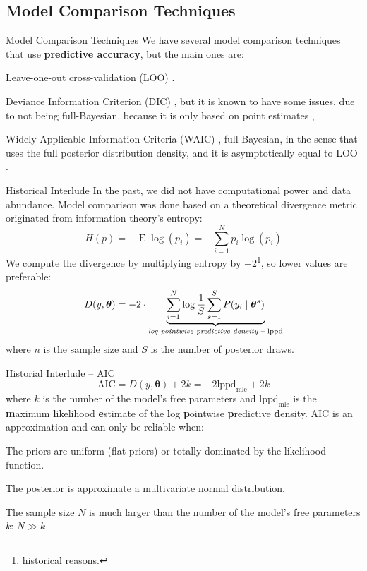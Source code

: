\subsection{Model Comparison Techniques}
\begin{frame}{Model Comparison Techniques}
	We have several model comparison techniques that use \textbf{predictive accuracy},
	but the main ones are:
	\begin{vfilleditems}
		\item Leave-one-out cross-validation (LOO)
		\parencite{vehtariPracticalBayesianModel2015}.
		\item Deviance Information Criterion (DIC)
		\parencite{spiegelhalter2002bayesian},
		but it is known to have some issues,
		due to not being full-Bayesian,
		because it is only based on point estimates \parencite{van2005dic},
		\item Widely Applicable Information Criteria (WAIC) \parencite{watanabe2010asymptotic},
		full-Bayesian,
		in the sense that uses the full posterior distribution density,
		and it is asymptotically equal to LOO \parencite{vehtariPracticalBayesianModel2015}.
	\end{vfilleditems}
\end{frame}

\begin{frame}{Historical Interlude}
	\small
	In the past, we did not have computational power and data abundance.
	Model comparison was done based on a theoretical divergence metric
	originated from information theory's entropy:
	$$
		H(p) = - \operatorname{E}\log(p_i) = -\sum^N_{i=1} p_i \log(p_i)
	$$
	\small
	We compute the divergence by multiplying entropy by $-2$\footnote{historical reasons.},
	so lower values are preferable:
	$$
		D(y, \boldsymbol{\theta}) = -2 \cdot \underbrace{\sum^N_{i=1} \log \frac{1}{S}\sum^S_{s=1} P(y_i \mid \boldsymbol{\theta}^s)}_{\text{\textit{log pointwise predictive density} -- lppd}}
	$$
	\footnotesize
	where $n$ is the sample size and $S$ is the number of posterior draws.
\end{frame}

\begin{frame}{Historial Interlude -- AIC \parencite{akaike1998information}}
	$$
		\text{AIC} = D(y, \boldsymbol{\theta}) + 2k = -2 \text{lppd}_{\text{mle}} + 2k
	$$
	where $k$ is the number of the model's free parameters and
	$\text{lppd}_{\text{mle}}$ is the
	\textbf{m}aximum \textbf{l}ikelihood \textbf{e}stimate of the
	\textbf{l}og \textbf{p}ointwise \textbf{p}redictive \textbf{d}ensity.
	\vfill
	AIC is an approximation and can only be reliable when:
	\begin{vfilleditems}
		\item The priors are uniform (flat priors) or totally dominated by the likelihood function.
		\item The posterior is approximate a multivariate normal distribution.
		\item The sample size $N$ is much larger than the number of the model's free parameters $k$: $N \gg k$
	\end{vfilleditems}
\end{frame}


